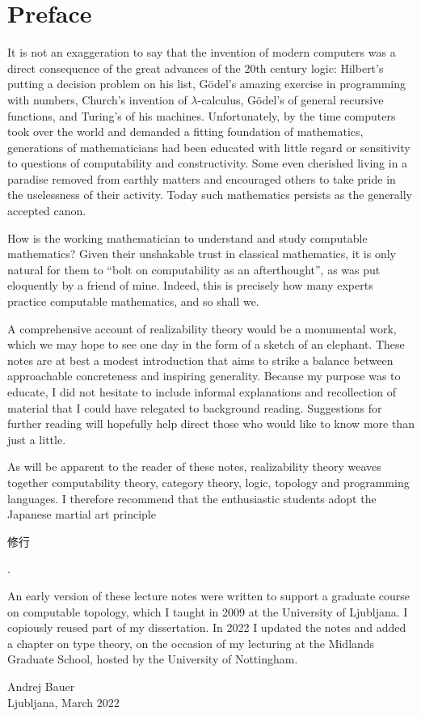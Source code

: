 \chapter*{Preface}

It is not an exaggeration to say that the invention of modern computers was a direct consequence of the great advances of the 20th century logic: Hilbert's putting a decision problem on his list, Gödel's amazing exercise in programming with numbers, Church's invention of $\lambda$-calculus, Gödel's of general recursive functions, and Turing's of his machines.
%
Unfortunately, by the time computers took over the world and demanded a fitting foundation of mathematics,
generations of mathematicians had been educated with little regard or sensitivity to questions of computability and constructivity.
%
Some even cherished living in a paradise removed from earthly matters and encouraged others to take pride in the uselessness of their activity.
%
Today such mathematics persists as the generally accepted canon.

How is the working mathematician to understand and study computable mathematics?
%
Given their unshakable trust in classical mathematics, it is only natural for them to ``bolt on computability as an afterthought'', as was put eloquently by a friend of mine.
%
Indeed, this is precisely how many experts practice computable mathematics, and so shall we.

A comprehensive account of realizability theory would be a monumental work, which we may hope to see one day in the form of a sketch of an elephant. These notes are at best a modest introduction that aims to strike a balance between approachable concreteness and inspiring generality. Because my purpose was to educate, I did not hesitate to include informal explanations and recollection of material that I could have relegated to background reading. Suggestions for further reading will hopefully help direct those who would like to know more than just a little.

As will be apparent to the reader of these notes, realizability theory weaves together computability theory, category theory, logic, topology and programming languages. I therefore recommend that the enthusiastic students adopt the Japanese martial art principle \begin{CJK}{UTF8}{min}修行\end{CJK}.

An early version of these lecture notes were written to support a graduate course on computable topology, which I taught in 2009 at the University of Ljubljana. I copiously reused part of my dissertation. In 2022 I updated the notes and added a chapter on type theory, on the occasion of my lecturing at the Midlands Graduate School, hosted by the University of Nottingham.



\bigskip

\begin{flushright}
Andrej Bauer\\
Ljubljana, March 2022
\end{flushright}

